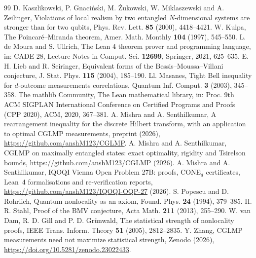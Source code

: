 \documentclass[11pt]{amsart}
\theoremstyle{definition}
\theoremstyle{remark}
\numberwithin{equation}{section}
\begin{document}
\begin{thebibliography}{99}
 D. Kaszlikowski, P. Gnaci\'nski, M. \.Zukowski, W. Miklaszewski and A. Zeilinger, Violations of local
realism by two entangled $N$-dimensional systems are stronger than for two qubits, Phys. Rev. Lett. \textbf{85} (2000),
4418--4421.
 W. Kulpa, The Poincar\'e--Miranda theorem, Amer. Math. Monthly \textbf{104} (1997), 545--550.
 L. de Moura and S. Ullrich, The Lean 4 theorem prover and programming language, in: CADE 28, Lecture
Notes in Comput. Sci. \textbf{12699}, Springer, 2021, 625--635.
 E. H. Lieb and R. Seiringer, Equivalent forms of the Bessis--Moussa--Villani conjecture, J. Stat. Phys.
\textbf{115} (2004), 185--190.
 Ll. Masanes, Tight Bell inequality for $d$-outcome measurements correlations, Quantum Inf. Comput.
\textbf{3} (2003), 345--358.
 The mathlib Community, The Lean mathematical library, in: Proc. 9th ACM SIGPLAN International
Conference on Certified Programs and Proofs (CPP 2020), ACM, 2020, 367--381.
 A. Mishra and A. Senthilkumar, A rearrangement inequality for the discrete Hilbert transform, with
an application to optimal CGLMP measurements, preprint (2026), \url{https://github.com/anshM123/CGLMP}.
 A. Mishra and A. Senthilkumar, CGLMP on maximally entangled states: exact optimality, rigidity and
Tsirelson bounds, \url{https://github.com/anshM123/CGLMP} (2026).
 A. Mishra and A. Senthilkumar, IQOQI Vienna Open Problem 27B: proofs, CONE$_d$ certificates, Lean~4
formalisations and re-verification reports, \url{https://github.com/anshM123/IQOQI-OQP-27}
(2026).
 S. Popescu and D. Rohrlich, Quantum nonlocality as an axiom, Found. Phys. \textbf{24} (1994), 379--385.
 H. R. Stahl, Proof of the BMV conjecture, Acta Math. \textbf{211} (2013), 255--290.
 W. van Dam, R. D. Gill and P. D. Gr\"unwald, The statistical strength of nonlocality proofs, IEEE Trans.
Inform. Theory \textbf{51} (2005), 2812--2835.
 Y. Zhang, CGLMP measurements need not maximize statistical strength, Zenodo (2026),
\url{https://doi.org/10.5281/zenodo.23022433}.
\end{thebibliography}
\end{document}
